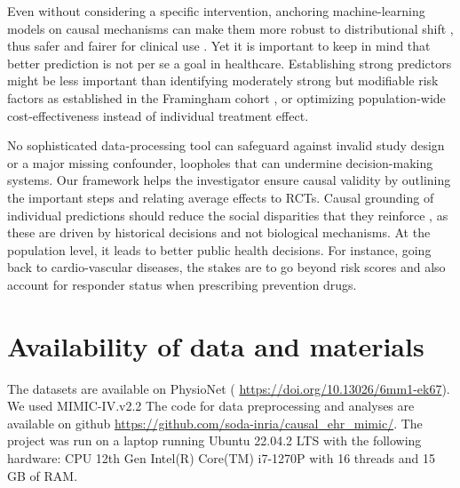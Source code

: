 \documentclass[10pt,letterpaper]{article}
\begin{document}
Even without considering a specific intervention, anchoring
machine-learning models on
causal mechanisms can make them more robust to distributional shift \cite{scholkopf2021toward},
thus safer and fairer for clinical use
\cite{richens2020improving,plecko2022causal}.
%
Yet it is important to keep in mind that better prediction is not per se
a goal in healthcare.
%
Establishing strong predictors might be less important than identifying
moderately strong but modifiable risk factors as established in the Framingham
cohort \cite{brand1976multivariate}, or optimizing population-wide cost-effectiveness instead of individual treatment effect.

No sophisticated data-processing tool can safeguard against
invalid study design or a major missing confounder, loopholes that can
undermine decision-making systems. Our framework helps the investigator
ensure
causal validity by outlining the important steps and relating average effects to
RCTs. Causal grounding of individual predictions should reduce the social
disparities that they reinforce
\cite{rajkomar2018ensuring,mitra2022future,ehrmann2023making}, as these are driven by
historical decisions and not biological mechanisms. At the population
level, it leads to better public health decisions. For instance, going
back to cardio-vascular diseases, the stakes are to go beyond risk
scores and also account for responder status when prescribing prevention
drugs.


\section*{Availability of data and materials}

The datasets are available on PhysioNet (
\url{https://doi.org/10.13026/6mm1-ek67}). We used MIMIC-IV.v2.2 The code for
data preprocessing and analyses are available on github
\url{https://github.com/soda-inria/causal_ehr_mimic/}.
The project was run on a laptop running Ubuntu 22.04.2 LTS with the following hardware: CPU 12th Gen Intel(R) Core(TM) i7-1270P with 16 threads and 15 GB of RAM.

\end{document}
